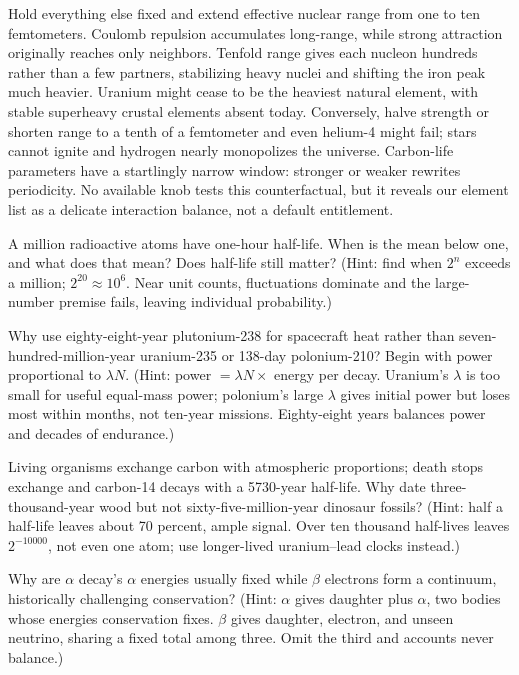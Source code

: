 \begin{thought}
Hold everything else fixed and extend effective nuclear range from one to ten femtometers. Coulomb repulsion accumulates long-range, while strong attraction originally reaches only neighbors. Tenfold range gives each nucleon hundreds rather than a few partners, stabilizing heavy nuclei and shifting the iron peak much heavier. Uranium might cease to be the heaviest natural element, with stable superheavy crustal elements absent today. Conversely, halve strength or shorten range to a tenth of a femtometer and even helium-4 might fail; stars cannot ignite and hydrogen nearly monopolizes the universe. Carbon-life parameters have a startlingly narrow window: stronger or weaker rewrites periodicity. No available knob tests this counterfactual, but it reveals our element list as a delicate interaction balance, not a default entitlement.
\end{thought}

\begin{puzzles}
\item A million radioactive atoms have one-hour half-life. When is the mean below one, and what does that mean? Does half-life still matter? (Hint: find when \(2^n\) exceeds a million; \(2^{20}\approx10^{6}\). Near unit counts, fluctuations dominate and the large-number premise fails, leaving individual probability.)
\item Why use eighty-eight-year plutonium-238 for spacecraft heat rather than seven-hundred-million-year uranium-235 or 138-day polonium-210? Begin with power proportional to \(\lambda N\). (Hint: power \(=\lambda N\times\) energy per decay. Uranium's \(\lambda\) is too small for useful equal-mass power; polonium's large \(\lambda\) gives initial power but loses most within months, not ten-year missions. Eighty-eight years balances power and decades of endurance.)
\item Living organisms exchange carbon with atmospheric proportions; death stops exchange and carbon-14 decays with a 5730-year half-life. Why date three-thousand-year wood but not sixty-five-million-year dinosaur fossils? (Hint: half a half-life leaves about 70 percent, ample signal. Over ten thousand half-lives leaves \(2^{-10000}\), not even one atom; use longer-lived uranium--lead clocks instead.)
\item Why are \(\alpha\) decay's \(\alpha\) energies usually fixed while \(\beta\) electrons form a continuum, historically challenging conservation? (Hint: \(\alpha\) gives daughter plus \(\alpha\), two bodies whose energies conservation fixes. \(\beta\) gives daughter, electron, and unseen neutrino, sharing a fixed total among three. Omit the third and accounts never balance.)
\end{puzzles}

